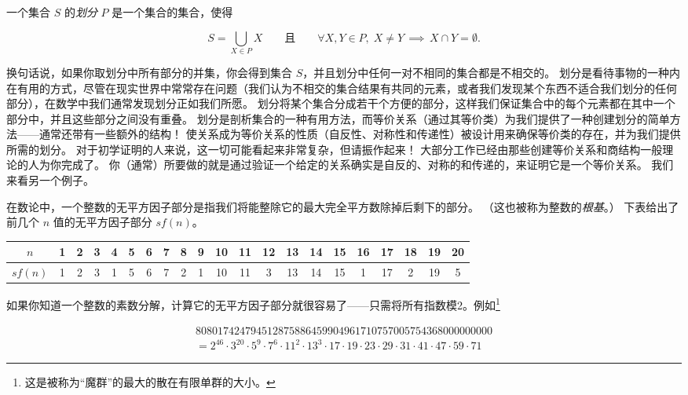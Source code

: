 \begin{defi} 一个集合 $S$ 的\emph{划分} $P$ 是一个集合的集合，使得

\[ S = \bigcup_{X \in P} X \qquad \mbox{且} \qquad %
\forall X, Y \in P, \;
X \neq Y \, \implies \, X \cap Y = \emptyset.
\]

\end{defi}

换句话说，如果你取划分中所有部分的并集，你会得到集合 $S$，并且划分中任何一对不相同的集合都是不相交的。
划分是看待事物的一种内在有用的方式，尽管在现实世界中常常存在问题（我们认为不相交的集合结果有共同的元素，或者我们发现某个东西不适合我们划分的任何部分），在数学中我们通常发现划分正如我们所愿。
划分将某个集合分成若干个方便的部分，这样我们保证集合中的每个元素都在其中一个部分中，并且这些部分之间没有重叠。
划分是剖析集合的一种有用方法，而等价关系（通过其等价类）为我们提供了一种创建划分的简单方法——通常还带有一些额外的结构！
使关系成为等价关系的性质（自反性、对称性和传递性）被设计用来确保等价类的存在，并为我们提供所需的划分。
对于初学证明的人来说，这一切可能看起来非常复杂，但请振作起来！
大部分工作已经由那些创建等价关系和商结构一般理论的人为你完成了。
你（通常）所要做的就是通过验证一个给定的关系确实是自反的、对称的和传递的，来证明它是一个等价关系。
我们来看另一个例子。

在数论中，一个整数的无平方因子部分是指我们将能整除它的最大完全平方数除掉后剩下的部分。
（这也被称为整数的\emph{根基}。）
下表给出了前几个 $n$ 值的无平方因子部分 $sf(n)$。

\begin{center}
\begin{tabular}{c|cccccccccccccccccccc}
$n$ & 1 & 2 & 3 & 4 & 5 & 6 & 7 & 8 & 9 & 10 & 11 & 12 & 13 & 14 & 15 & 16 & 17 & 18 & 19 & 20 \\ \hline
$sf(n)$ & 1 & 2 & 3 & 1& 5 & 6 & 7  & 2  & 1 & 10 & 11  & 3 & 13 & 14 & 15 & 1 & 17 & 2  & 19 & 5 \\
\end{tabular}
\end{center}  

如果你知道一个整数的素数分解，计算它的无平方因子部分就很容易了——只需将所有指数模2。例如\footnote{这是被称为“魔群”的最大的散在有限单群的大小。}

\begin{gather*} 
808017424794512875886459904961710757005754368000000000 \\ 
 = 2^{46}\cdot 3^{20}\cdot 5^9\cdot7^6\cdot 11^2\cdot 13^3\cdot 17
\cdot 19\cdot 23\cdot 29\cdot 31\cdot 41\cdot 47\cdot 59\cdot 71
\end{gather*}

